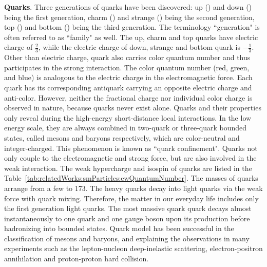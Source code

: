 \textbf{Quarks}. Three generations of quarks have been discovered: up (\PQu) and down (\PQd) being the first generation, charm (\PQc) and strange (\PQs) being the second generation, top (\PQt) and bottom (\PQb) being the third generation. The terminology ``generation" is often referred to as ``family" as well. The up, charm and top quarks have electric charge of $\frac{2}{3}$, while the electric charge of down, strange and bottom quark is $-\frac{1}{3}$. Other than electric charge, quark also carries color quantum number and thus participates in the strong interaction. The color quantum number (red, green, and blue) is analogous to the electric charge in the electromagnetic force. Each quark has its corresponding antiquark carrying an opposite electric charge and anti-color. However, neither the fractional charge nor individual color charge is observed in nature, because quarks never exist alone. Quarks and their properties only reveal during the high-energy short-distance local interactions. In the low energy scale, they are always combined in two-quark or three-quark bounded states, called mesons and baryons respectively, which are color-neutral and integer-charged. This phenomenon is known as ``quark confinement". Quarks not only couple to the electromagnetic and strong force, but are also involved in the weak interaction. The weak hypercharge and isospin of quarks are listed in the Table~\ref{tab:relatedWorks:smParticles:ewQuantumNumber}. The masses of quarks arrange from a few \MeV to 173\GeV. The heavy quarks decay into light quarks via the weak force with quark mixing. Therefore, the matter in our everyday life includes only the first generation light quarks. The most massive quark \PQt quark decays almost instantaneously to one \PQb quark and one \PW gauge boson upon its production before hadronizing into bounded states. Quark model has been successful in the classification of mesons and baryons, and explaining the observations in many experiments such as the lepton-nucleon deep-inelastic scattering, electron-positron annihilation and proton-proton hard collision.



